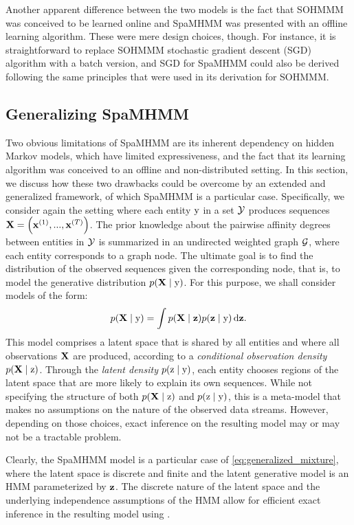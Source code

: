 Another apparent difference between the two models is the fact that SOHMMM was conceived to be learned online and SpaMHMM was presented with an offline learning algorithm. These were mere design choices, though. For instance, it is straightforward to replace SOHMMM stochastic gradient descent (SGD) algorithm with a batch version, and SGD for SpaMHMM could also be derived following the same principles that were used in its derivation for SOHMMM.

\subsection{Generalizing SpaMHMM}
\label{sec:generalizing_spamhmm}

Two obvious limitations of SpaMHMM are its inherent dependency on hidden Markov models, which have limited expressiveness, and the fact that its learning algorithm was conceived to an offline and non-distributed setting. In this section, we discuss how these two drawbacks could be overcome by an extended and generalized framework, of which SpaMHMM is a particular case. Specifically, we consider again the setting where each entity ${\textnormal{y}}$ in a set ${\mathcal{Y}}$ produces sequences ${\mathbf{X}} = \left({\mathbf{x}}^{(1)}, ...,{\mathbf{x}}^{(T)} \right)$. The prior knowledge about the pairwise affinity degrees between entities in ${\mathcal{Y}}$ is summarized in an undirected weighted graph ${\mathcal{G}}$, where each entity corresponds to a graph node. The ultimate goal is to find the distribution of the observed sequences given the corresponding node, that is, to model the generative distribution $p({\mathbf{X}} \mid {\textnormal{y}})$. For this purpose, we shall consider models of the form:
\begin{equation}
    \label{eq:generalized_mixture}
    p({\mathbf{X}} \mid {\textnormal{y}}) = \int p({\mathbf{X}} \mid {\mathbf{z}}) p({\mathbf{z}} \mid {\textnormal{y}}) {\,\text{d}}{\mathbf{z}}.
\end{equation}
This model comprises a latent space that is shared by all entities and where all observations ${\mathbf{X}}$ are produced, according to a \textit{conditional observation density} $p({\mathbf{X}} \mid {\textnormal{z}})$. Through the \textit{latent density} $p({\textnormal{z}} \mid {\textnormal{y}})$, each entity chooses regions of the latent space that are more likely to explain its own sequences. While not specifying the structure of both $p({\mathbf{X}} \mid {\textnormal{z}})$ and $p({\textnormal{z}} \mid {\textnormal{y}})$, this is a meta-model that makes no assumptions on the nature of the observed data streams. However, depending on those choices, exact inference on the resulting model may or may not be a tractable problem.

Clearly, the SpaMHMM model is a particular case of \eqref{eq:generalized_mixture}, where the latent space is discrete and finite and the latent generative model is an HMM parameterized by ${\mathbf{z}}$. The discrete nature of the latent space and the underlying independence assumptions of the HMM allow for efficient exact inference in the resulting model using .

